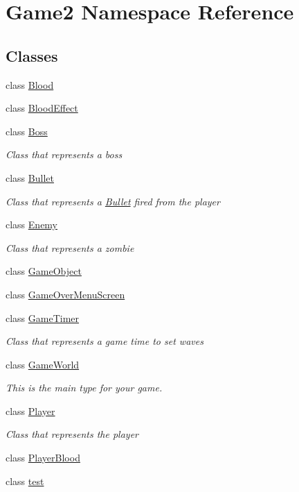 \hypertarget{namespace_game2}{}\section{Game2 Namespace Reference}
\label{namespace_game2}
\subsection*{Classes}
\begin{DoxyCompactItemize}
\item 
class \mbox{\hyperlink{class_game2_1_1_blood}{Blood}}
\item 
class \mbox{\hyperlink{class_game2_1_1_blood_effect}{Blood\+Effect}}
\item 
class \mbox{\hyperlink{class_game2_1_1_boss}{Boss}}
\begin{DoxyCompactList}\small\item\em Class that represents a boss \end{DoxyCompactList}\item 
class \mbox{\hyperlink{class_game2_1_1_bullet}{Bullet}}
\begin{DoxyCompactList}\small\item\em Class that represents a \mbox{\hyperlink{class_game2_1_1_bullet}{Bullet}} fired from the player \end{DoxyCompactList}\item 
class \mbox{\hyperlink{class_game2_1_1_enemy}{Enemy}}
\begin{DoxyCompactList}\small\item\em Class that represents a zombie \end{DoxyCompactList}\item 
class \mbox{\hyperlink{class_game2_1_1_game_object}{Game\+Object}}
\item 
class \mbox{\hyperlink{class_game2_1_1_game_over_menu_screen}{Game\+Over\+Menu\+Screen}}
\item 
class \mbox{\hyperlink{class_game2_1_1_game_timer}{Game\+Timer}}
\begin{DoxyCompactList}\small\item\em Class that represents a game time to set waves \end{DoxyCompactList}\item 
class \mbox{\hyperlink{class_game2_1_1_game_world}{Game\+World}}
\begin{DoxyCompactList}\small\item\em This is the main type for your game. \end{DoxyCompactList}\item 
class \mbox{\hyperlink{class_game2_1_1_player}{Player}}
\begin{DoxyCompactList}\small\item\em Class that represents the player \end{DoxyCompactList}\item 
class \mbox{\hyperlink{class_game2_1_1_player_blood}{Player\+Blood}}
\item 
class \mbox{\hyperlink{class_game2_1_1test}{test}}
\end{DoxyCompactItemize}
